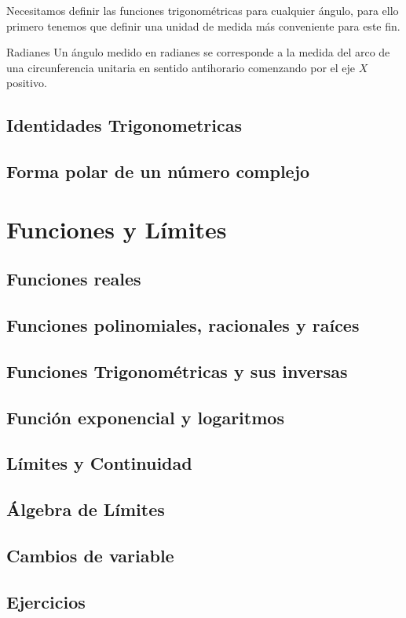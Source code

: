 \documentclass[11pt, twoside]{book}%
\begin{document}
Necesitamos definir las funciones trigonométricas para cualquier ángulo, para ello primero tenemos que definir una unidad de medida más conveniente para este fin.
\begin{definition}{Radianes}
    Un ángulo medido en radianes se corresponde a la medida del arco de una circunferencia unitaria en sentido antihorario comenzando por el eje \(X\) positivo.
\end{definition}
\section{Identidades Trigonometricas}

\section{Forma polar de un número complejo}



\chapter{Funciones y Límites}
\section{Funciones reales}
\section{Funciones polinomiales, racionales y raíces}
\section{Funciones Trigonométricas y sus inversas}
\section{Función exponencial y logaritmos}
\section{Límites y Continuidad}
\section{Álgebra de Límites}
\section{Cambios de variable}
\section{Ejercicios}

\printbibliography%
\printindex

%
%

\nopagecolor
\end{document}
